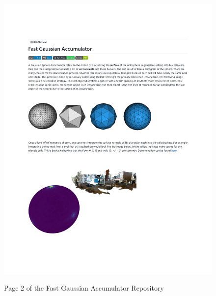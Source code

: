 \begin{figure}[h!]
    \centering\includegraphics[page=2, trim=1.0in 1.0in 1.0in 1.0in, width=.93\linewidth]{appendix_1/imgs/FastGAReadme.pdf}
    \label{fig:apx1_fg2}
    \caption{Page 2 of the Fast Gaussian Accumulator Repository} 
\end{figure}

